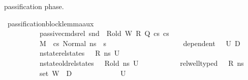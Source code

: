 \begin{isabellebody}
\begin{isamarkuptext}
passification phase.%
\end{isamarkuptext}\isamarkuptrue%
\isamarkupfalse%
\ passification{\isacharunderscore}{\kern0pt}block{\isacharunderscore}{\kern0pt}lemma{\isacharunderscore}{\kern0pt}aux{\isacharcolon}{\kern0pt}\isanewline
\ \ \ \isanewline
\ \ \ \ \ \ \ \ \ \ {\isachardoublequoteopen}passive{\isacharunderscore}{\kern0pt}cmds{\isacharunderscore}{\kern0pt}rel\ {\isacharparenleft}{\kern0pt}snd\ {\isasymLambda}{\isacharparenright}{\kern0pt}\ R{\isacharunderscore}{\kern0pt}old\ W\ R\ Q\ cs{}\ cs{}{\isachardoublequoteclose}\ \isanewline
\ \ \ \ \ \ \ \ \ \ {\isachardoublequoteopen}M{\isacharcomma}{\kern0pt}{\isasymLambda}{\isacharcomma}{\kern0pt}{\isasymGamma}{\isacharcomma}{\kern0pt}{\isasymOmega}\ {\isasymturnstile}\ {\isasymlangle}cs{}{\isacharcomma}{\kern0pt}\ Normal\ ns{\isasymrangle}\ {\isacharbrackleft}{\kern0pt}{\isasymrightarrow}{\isacharbrackright}{\kern0pt}\ s{\isacharprime}{\kern0pt}{\isachardoublequoteclose}\ \ \ \ \ \ \ \ \ \ \ \isanewline
\ \ \ \ \ \ \ \ \ \ {\isachardoublequoteopen}dependent\ {\isasymLambda}{\isacharprime}{\kern0pt}\ {\isasymOmega}\ U{}\ D{}{\isachardoublequoteclose}\ \isanewline
\ \ \ \ \ \ \ \ \ \ {\isachardoublequoteopen}nstate{\isacharunderscore}{\kern0pt}rel{\isacharunderscore}{\kern0pt}states\ {\isasymLambda}\ {\isasymLambda}{\isacharprime}{\kern0pt}\ R\ ns\ U{}{\isachardoublequoteclose}\ \isanewline
\ \ \ \ \ \ \ \ \ \ {\isachardoublequoteopen}nstate{\isacharunderscore}{\kern0pt}old{\isacharunderscore}{\kern0pt}rel{\isacharunderscore}{\kern0pt}states\ {\isasymLambda}\ {\isasymLambda}{\isacharprime}{\kern0pt}\ R{\isacharunderscore}{\kern0pt}old\ ns\ U{}{\isachardoublequoteclose}\ \isanewline
\ \ \ \ \ \ \ \ \ \ {\isachardoublequoteopen}rel{\isacharunderscore}{\kern0pt}well{\isacharunderscore}{\kern0pt}typed\ {\isasymLambda}\ {\isasymOmega}\ R\ ns{\isachardoublequoteclose}\ \isanewline
\ \ \ \ \ \ \ \ \ \ {\isachardoublequoteopen}{\isacharparenleft}{\kern0pt}set\ W{\isacharparenright}{\kern0pt}\ {\isasyminter}\ D{}\ {\isacharequal}{\kern0pt}\ {\isacharbraceleft}{\kern0pt}{\isacharbraceright}{\kern0pt}{\isachardoublequoteclose}\ \isanewline
\ \ \ \ \ \ \ \ \ \ {\isachardoublequoteopen}U{}\ {\isasymnoteq}\ {\isacharbraceleft}{\kern0pt}{\isacharbraceright}{\kern0pt}{\isachardoublequoteclose}\ \isanewline

\end{isabellebody}
